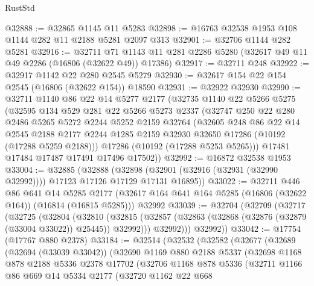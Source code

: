\begin{lexlean}{RustStd}
\begin{coremodule}
@32888 := @32865 @1145 @11 @5283
@32898 := @16763 @32538 @1953 @108 @1144 @282 @11 @2188 @5281 @2097 @313
@32901 := @32706 @1144 @282 @5281
@32916 := @32711
    @71
    @1143
    @11
    @281
    @2286
    @5280
    (@32617 @49 @11 @49 @2286 (@16806 (@32622 @49)) @17386)
@32917 := @32711 @248
@32922 := @32917 @1142 @22 @280 @2545 @5279
@32930 := @32617 @154 @22 @154 @2545 (@16806 (@32622 @154)) @18590
@32931 := @32922 @32930
@32990 := @32711
    @1140
    @86
    @22
    @14
    @5277
    @2177
    (@32735
      @1140
      @22
      @5266
      @5275
      (@32595
        @134
        @529
        @281
        @22
        @5266
        @5273
        @2337
        (@32747
          @250
          @22
          @280
          @2486
          @5265
          @5272
          @2244
          @5252
          @2159
          @32764
          (@32605
            @248
            @86
            @22
            @14
            @2545
            @2188
            @2177
            @2244
            @1285
            @2159
            @32930
            @32650
            @17286
            (@10192 (@17288 @5259 @2188)))
          @17286
          (@10192 (@17288 @5253 @5265)))
        @17481
        @17484
        @17487
        @17491
        @17496
        @17502))
@32992 := @16872 @32538 @1953
@33004 := @32885
    (@32888 (@32898 (@32901 (@32916 (@32931 (@32990 @32992)))) @17123 @17126 @17129 @17131 @16895))
@33022 := @32711
    @446
    @86
    @641
    @14
    @5285
    @2177
    (@32617 @164 @641 @164 @5285 (@16806 (@32622 @164)) (@16814 (@16815 @5285)))
    @32992
@33039 := @32704
    (@32709
      (@32717
        (@32725
          (@32804
            (@32810
              (@32815 (@32857 (@32863 (@32868 (@32876 (@32879 (@33004 @33022)) @25445)) @32992)))
              @32992)))
        @32992))
@33042 := @17754 (@17767 @880 @2378)
@33184 := @32514
    (@32532
      (@32582
        (@32677
          (@32689
            (@32694 (@33039 @33042))
            (@32690
              @1169
              @880
              @2188
              @5337
              (@32698
                @1168
                @878
                @2188
                @5336
                @2378
                @17702
                (@32706
                  @1168
                  @878
                  @5336
                  (@32711
                    @1166
                    @86
                    @669
                    @14
                    @5334
                    @2177
                    (@32720
                      @1162
                      @22
                      @668

\end{coremodule}
\end{lexlean}
